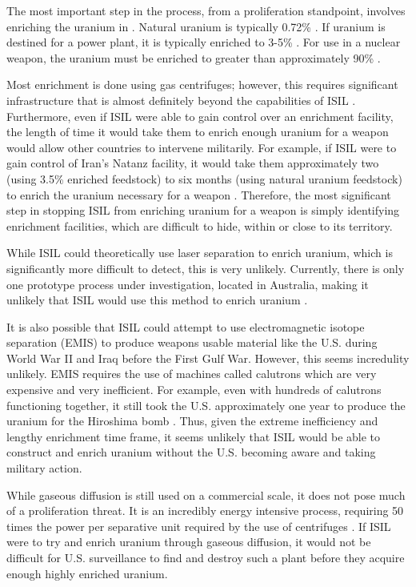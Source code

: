 \documentclass{report}
\begin{document}
The most important step in the process, from a proliferation standpoint, involves enriching the uranium in . Natural uranium is typically 0.72\%  \cite{Benedict1981}.  If uranium is destined for a power plant, it is typically enriched to  3-5\% . For use in a nuclear weapon, the uranium must be enriched to greater than approximately 90\%  \cite{Moody2014}. 

Most enrichment is done using gas centrifuges; however, this requires significant infrastructure that is almost definitely beyond the capabilities of ISIL \cite{Benedict1981}.  Furthermore, even if ISIL were able to gain control over an enrichment facility, the length of time it would take them to enrich enough uranium for a weapon would allow other countries to intervene militarily. For example, if ISIL were to gain control of Iran's Natanz facility, it would take them approximately two (using 3.5\% enriched feedstock) to six months (using natural uranium feedstock) to enrich the uranium necessary for a weapon \cite{WisconsinProjectonNuclearArmsControl2015,Heinonen2015}. Therefore, the most significant step  in stopping ISIL from enriching uranium for a weapon is simply identifying enrichment facilities, which are difficult to hide, within or close to its territory. 

While ISIL could theoretically use laser separation to enrich uranium, which is significantly more difficult to detect, this is very unlikely. Currently, there is only one prototype process under investigation, located in Australia, making it unlikely that ISIL would use this method to enrich uranium \cite{Moody2014}. 

It is also possible that ISIL could attempt to use electromagnetic isotope separation (EMIS) to produce weapons usable material like the U.S. during World War II and Iraq before the First Gulf War. However, this seems incredulity unlikely. EMIS requires the use of machines called calutrons which are very expensive and very inefficient. For example, even with hundreds of calutrons functioning together, it still took the U.S. approximately one year to produce the uranium for the Hiroshima bomb \cite{Moody2014}. Thus, given the extreme inefficiency and lengthy enrichment time frame, it seems unlikely that ISIL would be able to construct and enrich uranium without the U.S. becoming aware and taking military action.

While gaseous diffusion is still used on a commercial scale, it does not pose much of a proliferation threat. It is an incredibly energy intensive process, requiring 50 times the power per separative unit required by the use of centrifuges \cite{WorldNuclearAssociation2015b}. If ISIL were to try and enrich uranium through gaseous diffusion, it would not be difficult for U.S. surveillance to find and destroy such a plant before they acquire enough highly enriched uranium.
\end{document}
